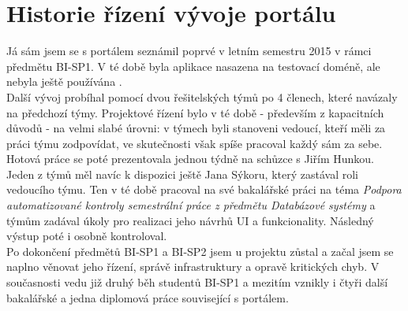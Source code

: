 \section{Historie řízení vývoje portálu} \label{intro:management}

Já sám jsem se s portálem seznámil poprvé v letním semestru 2015 v rámci předmětu BI-SP1. V té době byla aplikace nasazena na testovací doméně, ale nebyla ještě používána .\\
Další vývoj probíhal pomocí dvou řešitelských týmů po 4 členech, které navázaly na předchozí týmy. Projektové řízení bylo v té době - především z kapacitních důvodů - na velmi slabé úrovni: v týmech byli stanoveni vedoucí, kteří měli za práci týmu zodpovídat, ve skutečnosti však spíše pracoval každý sám za sebe. Hotová práce se poté prezentovala jednou týdně na schůzce s Jiřím Hunkou. Jeden z týmů měl navíc k dispozici ještě Jana Sýkoru, který zastával roli vedoucího týmu. Ten v té době pracoval na své bakalářské práci na téma \emph{Podpora automatizované kontroly semestrální práce z předmětu Databázové systémy} a týmům zadával úkoly pro realizaci jeho návrhů UI a funkcionality. Následný výstup poté i osobně kontroloval.\\
Po dokončení předmětů BI-SP1 a BI-SP2 jsem u projektu zůstal a začal jsem se naplno věnovat jeho řízení, správě infrastruktury a opravě kritických chyb. V současnosti vedu již druhý běh studentů BI-SP1 a mezitím vznikly i čtyři další bakalářské a jedna diplomová práce související s portálem.
